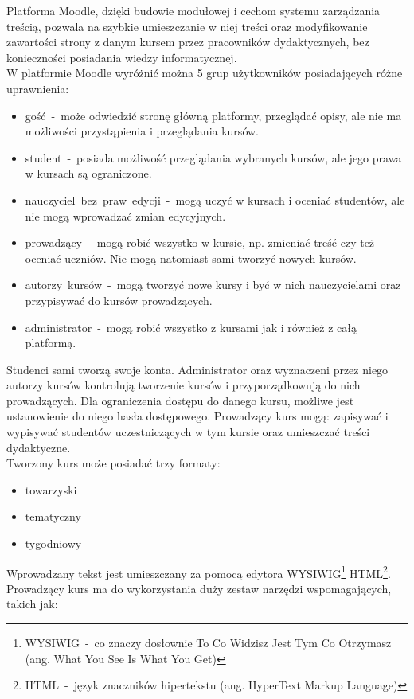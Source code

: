 Platforma Moodle, dzięki budowie modułowej i cechom systemu zarządzania treścią, pozwala na szybkie umieszczanie w niej treści oraz modyfikowanie zawartości strony z danym kursem przez pracowników dydaktycznych, bez konieczności posiadania wiedzy informatycznej. \\
W platformie Moodle wyróżnić można 5 grup użytkowników posiadających różne uprawnienia: \\
	\begin{itemize}
		\item gość~-~może odwiedzić stronę główną platformy, przeglądać opisy, ale nie ma możliwości przystąpienia i przeglądania kursów.
		\item student~-~posiada możliwość przeglądania wybranych kursów, ale jego prawa w kursach są ograniczone.
		\item nauczyciel~bez~praw~edycji~-~mogą uczyć w kursach i oceniać studentów, ale nie mogą wprowadzać zmian edycyjnych.
		\item prowadzący~-~mogą robić wszystko w kursie, np. zmieniać treść czy też oceniać uczniów. Nie mogą natomiast sami tworzyć nowych kursów.
		\item autorzy~kursów~-~mogą tworzyć nowe kursy i być w nich nauczycielami oraz przypisywać do kursów prowadzących.
		\item administrator~-~mogą robić wszystko z kursami jak i również z całą platformą.
	\end{itemize}
Studenci sami tworzą swoje konta. Administrator oraz wyznaczeni przez niego autorzy kursów kontrolują tworzenie kursów i przyporządkowują do nich prowadzących. Dla ograniczenia dostępu do danego kursu, możliwe jest ustanowienie do niego hasła dostępowego. Prowadzący kurs mogą: zapisywać i wypisywać studentów uczestniczących w tym kursie oraz umieszczać treści dydaktyczne. \\
Tworzony kurs może posiadać trzy formaty: \\
	\begin{itemize}
		\item towarzyski
		\item tematyczny
		\item tygodniowy
	\end{itemize}
Wprowadzany tekst jest umieszczany za pomocą edytora WYSIWIG\footnote{WYSIWIG~-~co znaczy dosłownie To Co Widzisz Jest Tym Co Otrzymasz (ang. What You See Is What You Get)} HTML\footnote{HTML~-~język znaczników hipertekstu (ang. HyperText Markup Language)}. Prowadzący kurs ma do wykorzystania duży zestaw narzędzi wspomagających, takich jak:\\
